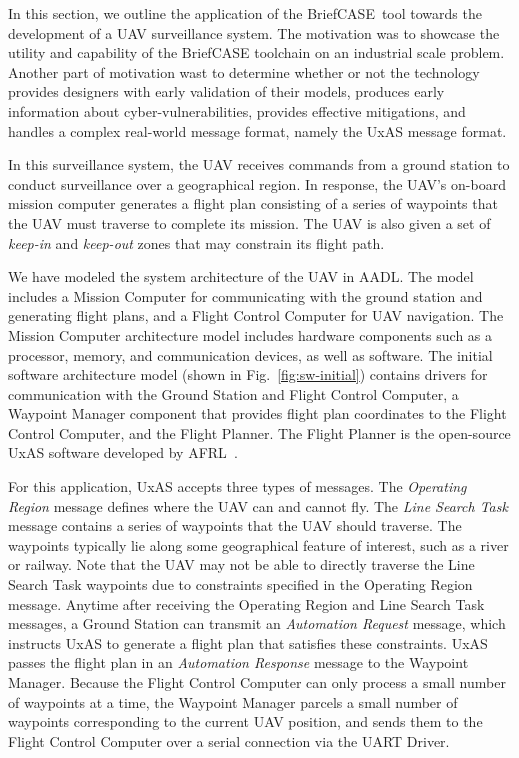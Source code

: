\documentclass[global,twocolumn]{svjour}
\newcommand{\figref}[1]{Fig.~\ref{#1}}
\newcommand{\brfcs}{BriefCASE}
\begin{document}
In this section, we outline the application of the \brfcs\ tool towards the development of a UAV surveillance system.
%
The motivation was to showcase the utility and capability of the BriefCASE toolchain on an industrial scale problem.
%
Another part of motivation wast to determine whether or not the technology provides designers with early validation of their models,
%
produces early information about cyber-vulnerabilities,
%
provides effective mitigations,
%
and handles a complex real-world message format, namely the UxAS message format.

In this surveillance system, the UAV receives commands from a ground station to conduct surveillance over a geographical region.
%
In response, the UAV's on-board mission computer generates a flight plan consisting of a series of waypoints that the UAV must traverse to complete its mission.
%
The UAV is also given a set of \textit{keep-in} and \textit{keep-out} zones that may constrain its flight path.

We have modeled the system architecture of the UAV in AADL.
%
The model includes a Mission Computer for communicating with the ground station and generating flight plans, and a Flight Control Computer for UAV navigation.
%
The Mission Computer architecture model includes hardware components such as a processor, memory, and communication devices, as well as software.
%
The initial software architecture model (shown in \figref{fig:sw-initial}) contains drivers for communication with the Ground Station and Flight Control Computer, a Waypoint Manager component that provides flight plan coordinates to the Flight Control Computer, and the Flight Planner.
%
The Flight Planner is the open-source UxAS software developed by AFRL~\cite{uxas}.

For this application, UxAS accepts three types of messages.
%
The \textit{Operating Region} message defines where the UAV can and cannot fly.
%
The \textit{Line Search Task} message contains a series of waypoints that the UAV should traverse.
%
The waypoints typically lie along some geographical feature of interest, such as a river or railway.
%
Note that the UAV may not be able to directly traverse the Line Search Task waypoints due to constraints specified in the Operating Region message.
%
Anytime after receiving the Operating Region and Line Search Task messages, a Ground Station can transmit an \textit{Automation Request} message, which instructs UxAS to generate a flight plan that satisfies these constraints.
%
UxAS passes the flight plan in an \textit{Automation Response} message to the Waypoint Manager.
%
Because the Flight Control Computer can only process a small number of waypoints at a time, the Waypoint Manager parcels a small number of waypoints corresponding to the current UAV position, and sends them to the Flight Control Computer over a serial connection via the UART Driver.
\end{document}
